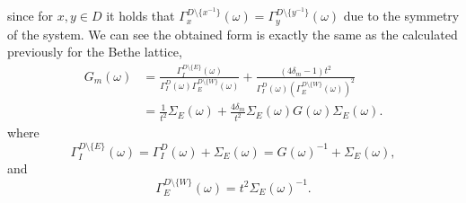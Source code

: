 \documentclass{article}
\begin{document}
since for $x,y \in D$ it holds that $\Gamma_x^{D \setminus \{x^{-1}\}}(\omega) = \Gamma_{y}^{D \setminus \{y^{-1}\}}(\omega)$ due to the symmetry of the system. We can see the obtained form is exactly the same as the calculated previously for the Bethe lattice,
\begin{equation}
\begin{split}
    G_m(\omega) &= 
    \frac{\Gamma_I^{D \setminus \{E\}}(\omega)}
    {\Gamma_I^{D}(\omega)\Gamma_E^{D \setminus \{W\}}(\omega)}
    +  
    \frac{\left(4\delta_m - 1\right) t^2}
    {\Gamma_I^{D}(\omega)\left(\Gamma_E^{D \setminus \{W\}}(\omega)\right)^2} \\
    &=
    \frac{1}{t^2}\Sigma_E(\omega) + \frac{4\delta_m}{t^2} \Sigma_E(\omega)G(\omega)\Sigma_E(\omega).
\end{split}
\end{equation}
where 
\begin{equation}
    \Gamma_I^{D \setminus \{E\}}(\omega) = \Gamma_I^{D}(\omega) + \Sigma_{E}(\omega) = G(\omega)^{-1} + \Sigma_{E}(\omega),
\end{equation}
and
\begin{equation}
    \Gamma_E^{D \setminus \{W\}}(\omega) = t^2 \Sigma_E(\omega)^{-1}.
\end{equation}
\end{document}

